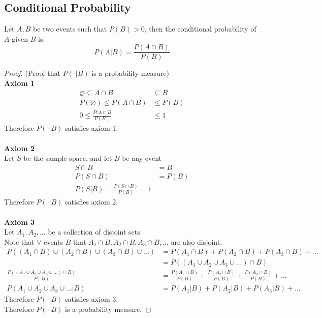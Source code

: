 \documentclass[12pt]{article}
\begin{document}
\subsection{Conditional Probability}

\begin{tcolorbox}[title=Conditional Probability]
	Let $A,B$ be two events such that $P(B) > 0$, then the conditional probability of $A$ given $B$ is:
	$$P(A | B) = \frac{P(A \cap B)}{P(B)}$$
\end{tcolorbox}

\begin{proof}
	(Proof that $P(\cdot | B)$ is a probability measure)\\
	\textbf{Axiom 1}\\
	\begin{align*}
		\varnothing \subseteq A \cap B &\subseteq B\\
		P(\varnothing) \leq P(A \cap B) &\leq P(B)\\
		0 \leq \frac{P(A \cap B}{P(B)} &\leq 1
	\end{align*}
	Therefore $P(\cdot | B)$ satisfies axiom 1.\\
	\\
	\textbf{Axiom 2}\\
	Let $S$ be the sample space, and let $B$ be any event\\
	\begin{align*}
		S \cap B &= B\\
		P(S \cap B) &= P(B)\\
		P(S | B) = \frac{P(S \cap B)}{P(B)} = 1
	\end{align*}
	Therefore $P(\cdot | B)$ satisfies axiom 2.\\
	\\
	\textbf{Axiom 3}\\
	Let $A_1, A_2, ...$ be a collection of disjoint sets\\
	Note that $\forall$ events $B$ that $A_1 \cap B, A_2 \cap B,A_3 \cap B, ...$ are also disjoint.
	\begin{align*}
		P((A_1 \cap B) \cup (A_2 \cap B) \cup (A_3 \cap B) \cup ...) &= P(A_1 \cap B) + P(A_2 \cap B) + P(A_3 \cap B) + ...\\
		&= P((A_1 \cup A_2 \cup A_3 \cup ...) \cap B)\\
		\frac{P((A_1 \cup A_2 \cup A_3 \cup ...) \cap B)}{P(B)} &= \frac{P(A_1 \cap B)}{P(B)} + \frac{P(A_2 \cap B)}{P(B)} + \frac{P(A_3 \cap B)}{P(B)} + ...\\
		P(A_1 \cup A_2 \cup A_3 \cup ...  | B) &= P(A_1 | B) + P(A_2 | B) + P(A_3 | B) + ...
	\end{align*}
	Therefore $P(\cdot | B)$ satisfies axiom 3.\\
	Therefore $P(\cdot | B)$ is a probability measure.
\end{proof}
\end{document}
